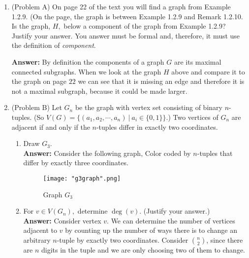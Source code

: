 \documentclass{amsart}
\newcommand{\vertex}{\node[vertex]}
\begin{document}
\thispagestyle{fancy}
 
\begin{enumerate}
\item (Problem A) On page 22 of the text you will find a graph from Example 1.2.9. (On the page, the graph is between Example 1.2.9 and Remark 1.2.10.\\

Is the graph, $H,$ below a component of the graph from Example 1.2.9? Justify your answer. You answer must be formal and, therefore, it must use the definition of \emph{component}.

\begin{center}
\end{center}

\textbf{Answer:} By definition the components of a graph $G$ are its maximal connected subgraphs. When we look at the graph $H$ above and compare it to the graph on page $22$ we can see that it is missing an edge and therefore it is not a maximal subgraph, because it could be made larger. 
	\vspace{0.25in}


\item (Problem B) Let $G_n$ be the graph with vertex set consisting of binary $n$-tuples. (So $V(G)=\{(a_1,a_2,\cdots,a_n) \: | \: a_i \in \{0,1\}\}.$) Two vertices of $G_n$ are adjacent if and only if the $n$-tuples differ in exactly two coordinates.\\
	\begin{enumerate}
	\item Draw $G_3.$\\
	\textbf{Answer:} Consider the following graph, Color coded by $n$-tuples that differ by exactly three coordinates.

\begin{figure}[H]
\caption{Graph $G_3$}
\centering
\texttt{[image: "g3graph".png]}
\end{figure}
	
	\vspace{0.25in}
	
	\item For $v \in V(G_n),$ determine $\deg(v).$ (Justify your answer.)\\
	\textbf{Answer:} Consider vertex $v$. We can determine the number of vertices adjacent to $v$ by counting up the number of ways there is to change an arbitrary $n$-tuple by exactly two coordinates. Consider $n \choose 2$, since there are $n$ digits in the tuple and we are only choosing two of them to change. 
	

\end{enumerate}
\end{enumerate}
\end{document}
